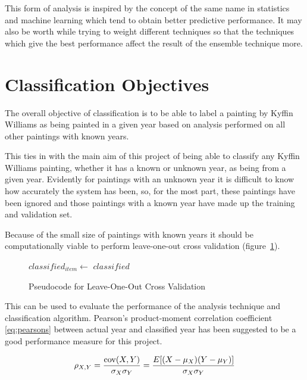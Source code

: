 This form of analysis is inspired by the concept of the same name in statistics and machine 
learning which tend to obtain better predictive performance. It may also be worth while trying to
weight different techniques so that the techniques which give the best performance affect the 
result of the ensemble technique more.


\section{Classification Objectives}
The overall objective of classification is to be able to label a painting by Kyffin Williams as 
being painted in a given year based on analysis performed on all other paintings with known years.

This ties in with the main aim of this project of being able to classify any Kyffin Williams
painting, whether it has a known or unknown year, as being from a given year. Evidently for 
paintings with an unknown year it is difficult to know how accurately the system has been, so, for
the most part, these paintings have been ignored and those paintings with a known year have made
up the training and validation set.

Because of the small size of paintings with known years it should be computationally viable to 
perform leave-one-out cross validation (figure~\ref{fig:loocv}).

\begin{figure}[h]
\begin{algorithmic}
 
    \State $classified_{item} \gets$  
  \EndFor
  \Statex
  \Return $classified$
\EndFunction
\end{algorithmic}
\caption{Pseudocode for Leave-One-Out Cross Validation}\label{fig:loocv}
\end{figure}

This can be used to evaluate the performance of the analysis technique and classification 
algorithm. Pearson's product-moment correlation coefficient \eqref{eq:pearsons} between actual year
and classified year has been suggested to be a good performance measure for this project.

\begin{equation}\label{eq:pearsons}
\rho_{X,Y}={\mathrm{cov}(X,Y) \over \sigma_X \sigma_Y} ={E[(X-\mu_X)(Y-\mu_Y)] \over \sigma_X\sigma_Y}
\end{equation}


